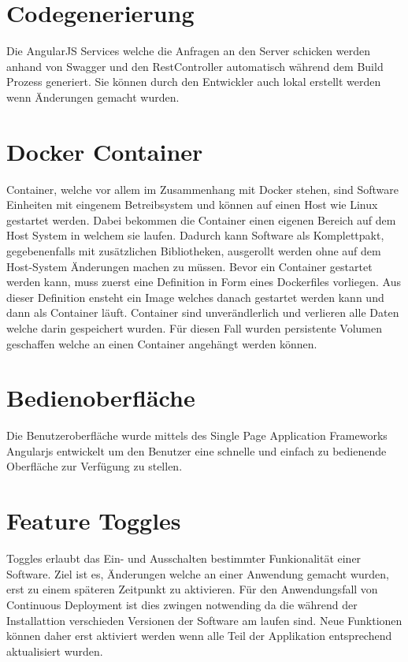 \section{Codegenerierung}

Die AngularJS Services welche die Anfragen an den Server schicken werden anhand von Swagger und den RestController automatisch während dem Build Prozess generiert. Sie können durch den Entwickler auch lokal erstellt werden wenn Änderungen gemacht wurden.

\section{Docker Container}
\label{container}
Container, welche vor allem im Zusammenhang mit Docker stehen, sind Software Einheiten mit eingenem Betreibsystem und können auf einen Host wie Linux gestartet werden. Dabei bekommen die Container einen eigenen Bereich auf dem Host System in welchem sie laufen. Dadurch kann Software als Komplettpakt, gegebenenfalls mit zusätzlichen Bibliotheken, ausgerollt werden ohne auf dem Host-System Änderungen machen zu müssen. \newline
Bevor ein Container gestartet werden kann, muss zuerst eine Definition in Form eines Dockerfiles vorliegen. Aus dieser Definition ensteht ein Image welches danach gestartet werden kann und dann als Container läuft. Container sind unverändlerlich und verlieren alle Daten welche darin gespeichert wurden. Für diesen Fall wurden persistente Volumen geschaffen welche an einen Container angehängt werden können.

\section{Bedienoberfläche}

Die Benutzeroberfläche wurde mittels des Single Page Application Frameworks Angularjs entwickelt um den Benutzer eine schnelle und einfach zu bedienende Oberfläche zur Verfügung zu stellen. 

\section{Feature Toggles}
\label{toggles}

Toggles erlaubt das Ein- und Ausschalten bestimmter Funkionalität einer Software. Ziel ist es, Änderungen welche an einer Anwendung gemacht wurden, erst zu einem späteren Zeitpunkt zu aktivieren. Für den Anwendungsfall von Continuous Deployment ist dies zwingen notwending da die während der Installattion verschieden Versionen der Software am laufen sind. Neue Funktionen können daher erst aktiviert werden wenn alle Teil der Applikation entsprechend aktualisiert wurden.

